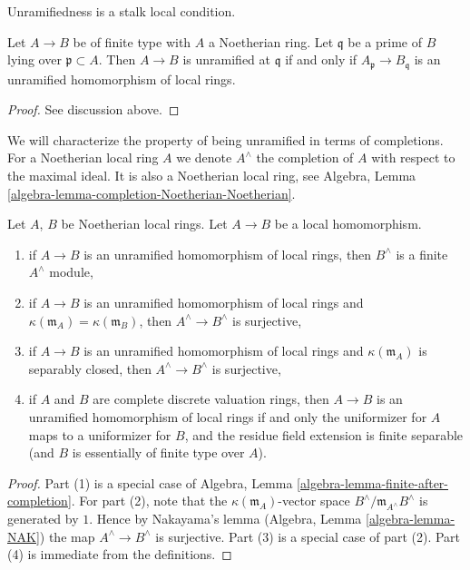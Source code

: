 \begin{lemma}
\label{lemma-characterize-unramified-Noetherian}
\begin{slogan}
Unramifiedness is a stalk local condition.
\end{slogan}
Let $A \to B$ be of finite type with $A$ a Noetherian ring.
Let $\mathfrak q$ be a prime of $B$ lying over $\mathfrak p \subset A$.
Then $A \to B$ is unramified at $\mathfrak q$ if and only if
$A_{\mathfrak p} \to B_{\mathfrak q}$ is an unramified homomorphism
of local rings.
\end{lemma}

\begin{proof}
See discussion above.
\end{proof}

\noindent
We will characterize the property of being unramified in terms
of completions. For a Noetherian local ring $A$
we denote $A^\wedge$ the completion of $A$ with respect to the
maximal ideal. It is also a Noetherian local ring, see
Algebra, Lemma \ref{algebra-lemma-completion-Noetherian-Noetherian}.

\begin{lemma}
\label{lemma-unramified-completions}
Let $A$, $B$ be Noetherian local rings.
Let $A \to B$ be a local homomorphism.
\begin{enumerate}
\item if $A \to B$ is an unramified homomorphism of local rings,
then $B^\wedge$ is a finite $A^\wedge$ module,
\item if $A \to B$ is an unramified homomorphism of local rings and
$\kappa(\mathfrak m_A) = \kappa(\mathfrak m_B)$,
then $A^\wedge \to B^\wedge$ is surjective,
\item if $A \to B$ is an unramified homomorphism of local rings
and $\kappa(\mathfrak m_A)$
is separably closed, then $A^\wedge \to B^\wedge$ is surjective,
\item if $A$ and $B$ are complete discrete valuation rings, then
$A \to B$ is an unramified homomorphism of local rings
if and only the uniformizer for $A$ maps to a uniformizer for $B$,
and the residue field extension is finite separable (and $B$ is
essentially of finite type over $A$).
\end{enumerate}
\end{lemma}

\begin{proof}
Part (1) is a special case of
Algebra, Lemma \ref{algebra-lemma-finite-after-completion}.
For part (2), note that the $\kappa(\mathfrak m_A)$-vector space
$B^\wedge/\mathfrak m_{A^\wedge}B^\wedge$
is generated by $1$. Hence by Nakayama's lemma
(Algebra, Lemma \ref{algebra-lemma-NAK}) the map
$A^\wedge \to B^\wedge$ is surjective.
Part (3) is a special case of part (2).
Part (4) is immediate from the definitions.
\end{proof}

